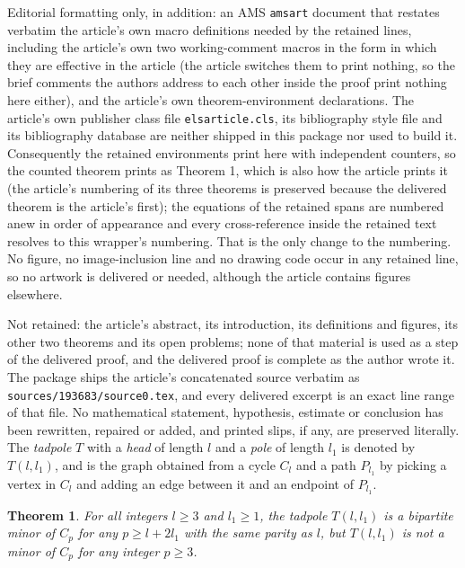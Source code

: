 \documentclass[10pt,a4paper]{amsart}
\theoremstyle{plain}
\newtheorem{theorem}{Theorem}
\theoremstyle{definition}
\theoremstyle{remark}
\begin{document}
Editorial formatting only, in addition: an AMS \texttt{amsart} document that restates verbatim the article's own macro definitions needed by the retained lines, including the article's own two working-comment macros in the form in which they are effective in the article (the article switches them to print nothing, so the brief comments the authors address to each other inside the proof print nothing here either), and the article's own theorem-environment declarations. The article's own publisher class file \texttt{elsarticle.cls}, its bibliography style file and its bibliography database are neither shipped in this package nor used to build it. Consequently the retained environments print here with independent counters, so the counted theorem prints as Theorem 1, which is also how the article prints it (the article's numbering of its three theorems is preserved because the delivered theorem is the article's first); the equations of the retained spans are numbered anew in order of appearance and every cross-reference inside the retained text resolves to this wrapper's numbering. That is the only change to the numbering. No figure, no image-inclusion line and no drawing code occur in any retained line, so no artwork is delivered or needed, although the article contains figures elsewhere.

Not retained: the article's abstract, its introduction, its definitions and figures, its other two theorems and its open problems; none of that material is used as a step of the delivered proof, and the delivered proof is complete as the author wrote it. The package ships the article's concatenated source verbatim as \texttt{sources/193683/source0.tex}, and every delivered excerpt is an exact line range of that file. No mathematical statement, hypothesis, estimate or conclusion has been rewritten, repaired or added, and printed slips, if any, are preserved literally.
The \emph{tadpole} $T$ with a \emph{head} of length $l$ and a \emph{pole} of length $l_1$ is denoted by $T(l,l_1)$, and is the graph obtained from a cycle $C_l$ and a path $P_{l_1}$ by picking a vertex in $C_l$ and adding an edge between it and an endpoint of $P_{l_1}$.

\begin{theorem}
    \label{thm: bip minor but not minor}
    For all integers $l\geq 3$ and $l_1\geq 1$, the tadpole $T(l,l_1)$ is a bipartite minor of $C_{p}$ for any $p\geq l+2l_1$ with the same parity as $l$, but $T(l,l_1)$ is not a minor of $C_p$ for any integer $p\geq 3$.
\end{theorem}
\end{document}
